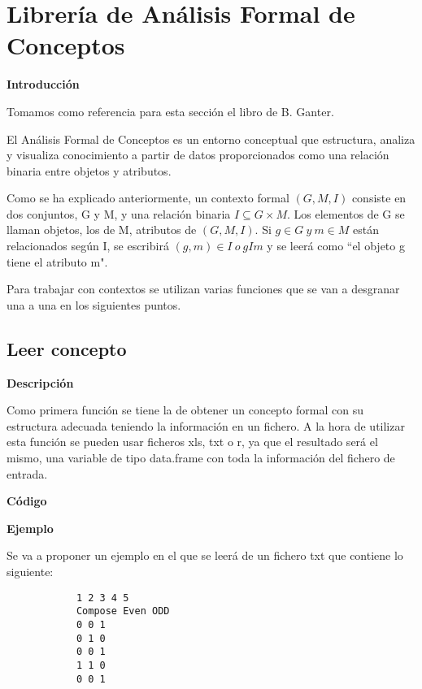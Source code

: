 \section{Librer\'ia de An\'alisis Formal de Conceptos}

\textbf{Introducci\'on}

Tomamos como referencia para esta secci\'on el libro de B. Ganter\cite{ganter}.

El An\'alisis Formal de Conceptos es un entorno conceptual que estructura, analiza y visualiza conocimiento a partir de datos proporcionados 
como una relaci\'on binaria entre objetos y atributos.

Como se ha explicado anteriormente, un contexto formal \( (G, M, I) \) consiste en dos conjuntos, G y M, y una relaci\'on binaria \( I \subseteq G \times M \). Los elementos 
de G se llaman objetos, los de M, atributos de \( (G, M, I) \). Si \(g \in G ~ y ~ m \in M \) est\'an relacionados seg\'un I, se escribir\'a 
\( (g,m) \in I ~ o ~ g I m \) y se leer\'a como ``el objeto g tiene el atributo m".

Para trabajar con contextos se utilizan varias funciones que se van a desgranar una a una en los siguientes puntos.

    \subsection{Leer concepto}

        \textbf{Descripci\'on}

        Como primera funci\'on se tiene la de obtener un concepto formal con su estructura adecuada teniendo la informaci\'on en un fichero. A la 
        hora de utilizar esta funci\'on se pueden usar ficheros xls, txt o r, ya que el resultado ser\'a el mismo, una variable de tipo data.frame 
        con toda la informaci\'on del fichero de entrada.
        \\

        \bigskip

        \textbf{C\'odigo}

        
        \bigskip

        \textbf{Ejemplo}

        Se va a proponer un ejemplo en el que se leer\'a de un fichero txt que contiene lo siguiente:

        \begin{verbatim}
            1 2 3 4 5
            Compose Even ODD
            0 0 1
            0 1 0
            0 0 1
            1 1 0
            0 0 1
        \end{verbatim}

